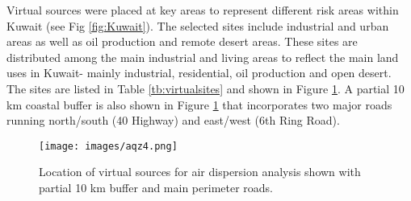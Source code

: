 Virtual sources were placed at key areas to represent different risk areas within Kuwait (see Fig \ref{fig:Kuwait}).  The selected sites include industrial and urban areas as well as oil production and remote desert areas. These sites are distributed among the main industrial and living areas to reflect the main land uses in Kuwait- mainly industrial, residential, oil production and open desert.  The sites are listed in Table \ref{tb:virtualsites} and shown in Figure \ref{fig:virtual-locations}. A partial 10 km coastal buffer is also shown in Figure \ref{fig:virtual-locations} that incorporates two major roads running north/south (40 Highway) and east/west (6th Ring Road).
%
\begin{table}[!htb]
\centering
\caption{Virtual Site locations.}
\label{tb:virtualsites}
\end{table}
%
%
\begin{figure}[!htb]
\texttt{[image: images/aqz4.png]} 
\caption[Location of virtual sources]{Location of virtual sources for air dispersion analysis shown with partial 10 km buffer and main perimeter roads.}
\label{fig:virtual-locations}
\end{figure}
%

